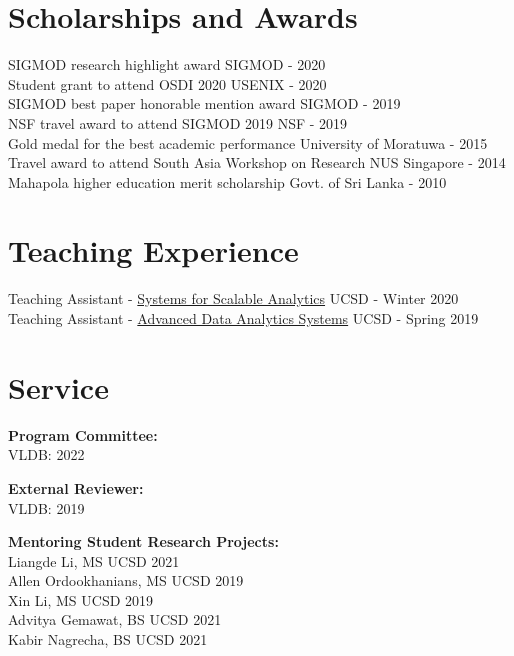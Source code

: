\documentclass[margin]{res}
\begin{document}
\begin{resume}
\section{Scholarships and Awards}
SIGMOD research highlight award \hfill SIGMOD - 2020\\
Student grant to attend OSDI 2020 \hfill USENIX - 2020\\
SIGMOD best paper honorable mention award \hfill SIGMOD - 2019\\
NSF travel award to attend SIGMOD 2019 \hfill NSF - 2019\\
Gold medal for the best academic performance \hfill University of Moratuwa - 2015\\
Travel award to attend South Asia Workshop on Research \hfill NUS Singapore - 2014\\
Mahapola higher education merit scholarship \hfill Govt. of Sri Lanka - 2010


\section{Teaching Experience}
Teaching Assistant - \href{http://cseweb.ucsd.edu/~arunkk/dsc102_winter20}{Systems for Scalable Analytics} \hfill UCSD - Winter 2020\\
Teaching Assistant - \href{http://cseweb.ucsd.edu/classes/wi19/cse291-f}{Advanced Data Analytics Systems} \hfill UCSD - Spring 2019


\section{Service}
\textbf{Program Committee:}\\
VLDB: 2022

\textbf{External Reviewer:}\\
VLDB: 2019

\textbf{Mentoring Student Research Projects:}\\
Liangde Li, MS UCSD 2021\\
Allen Ordookhanians, MS UCSD 2019\\
Xin Li, MS UCSD 2019\\

\vspace{-5mm}
Advitya Gemawat, BS UCSD 2021\\
Kabir Nagrecha, BS UCSD 2021



\end{resume}
\end{document}
